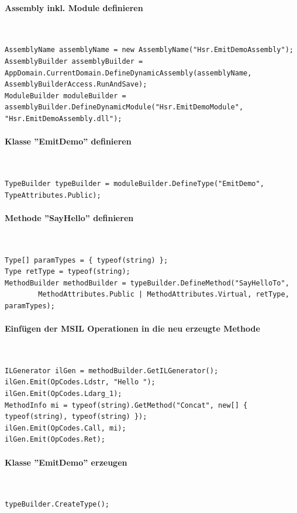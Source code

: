 \documentclass[
a4paper,
oneside,
10pt,
fleqn,
headsepline,
toc=listofnumbered, 
bibliography=totocnumbered]{scrartcl}
\begin{document}
\paragraph{Assembly inkl. Module definieren}\mbox{} \\
\begin{lstlisting}
AssemblyName assemblyName = new AssemblyName("Hsr.EmitDemoAssembly");
AssemblyBuilder assemblyBuilder = AppDomain.CurrentDomain.DefineDynamicAssembly(assemblyName, AssemblyBuilderAccess.RunAndSave);
ModuleBuilder moduleBuilder = assemblyBuilder.DefineDynamicModule("Hsr.EmitDemoModule", "Hsr.EmitDemoAssembly.dll");
\end{lstlisting}

\paragraph{Klasse ''EmitDemo'' definieren}\mbox{} \\
\begin{lstlisting}
TypeBuilder typeBuilder = moduleBuilder.DefineType("EmitDemo", TypeAttributes.Public);
\end{lstlisting}

\paragraph{Methode ''SayHello'' definieren}\mbox{} \\
\begin{lstlisting}
Type[] paramTypes = { typeof(string) };
Type retType = typeof(string);
MethodBuilder methodBuilder = typeBuilder.DefineMethod("SayHelloTo",
        MethodAttributes.Public | MethodAttributes.Virtual, retType, paramTypes);
\end{lstlisting}

\paragraph{Einfügen der MSIL Operationen in die neu erzeugte Methode}\mbox{} \\
\begin{lstlisting}
ILGenerator ilGen = methodBuilder.GetILGenerator();
ilGen.Emit(OpCodes.Ldstr, "Hello ");
ilGen.Emit(OpCodes.Ldarg_1);
MethodInfo mi = typeof(string).GetMethod("Concat", new[] { typeof(string), typeof(string) });
ilGen.Emit(OpCodes.Call, mi);
ilGen.Emit(OpCodes.Ret);
\end{lstlisting}

\paragraph{Klasse ''EmitDemo'' erzeugen}\mbox{} \\
\begin{lstlisting}
typeBuilder.CreateType();
\end{lstlisting}
\end{document}
